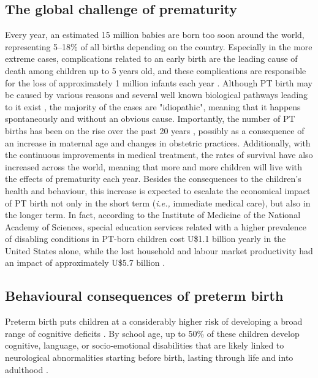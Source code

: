\subsection{The global challenge of prematurity}

Every year, an estimated 15 million babies are born too soon around the world, representing 5–18\% of all births depending on the country. 
Especially in the more extreme cases, complications related to an early birth are the leading cause of death among children up to 5 years old, and these complications are responsible for the loss of approximately 1 million infants each year \citep{Liu2016}. 
Although PT birth may be caused by various reasons and several well known biological pathways leading to it exist \citep{Behrman2007}, the majority of the cases are "idiopathic", meaning that it happens spontaneously and without an obvious cause.
Importantly, the number of PT births has been on the rise over the past 20 years \citep{Costeloe2012}, possibly as a consequence of  an increase in maternal age and changes in obstetric practices. 
Additionally, with the continuous improvements in medical treatment, the rates of survival have also increased across the world, meaning that more and more children will live with the effects of prematurity each year. 
Besides the consequences to the children's health and behaviour, this increase is expected to escalate the economical impact of PT birth not only in the short term (\textit{i.e.,} immediate medical care), but also in the longer term. 
In fact, according to the Institute of Medicine of the National Academy of Sciences, special education services related with a higher prevalence of disabling conditions in PT-born children cost U\$1.1 billion yearly in the United States alone, while the lost household and labour market productivity had an impact of approximately U\$5.7 billion \citep{Behrman2007}. %





\subsection{Behavioural consequences of preterm birth}

Preterm birth puts children at a considerably higher risk of developing a broad range of cognitive deficits \citep{Brydges2018, Twilhaar2018}. %
By school age, up to 50\% of these children develop cognitive, language, or socio-emotional disabilities that are likely linked to neurological abnormalities starting before birth, lasting through life and into adulthood \citep{Gozzo2009, Chaminade2013, Moiseev2014, Hornman2016, Thomason2017, Burnett2018}.

